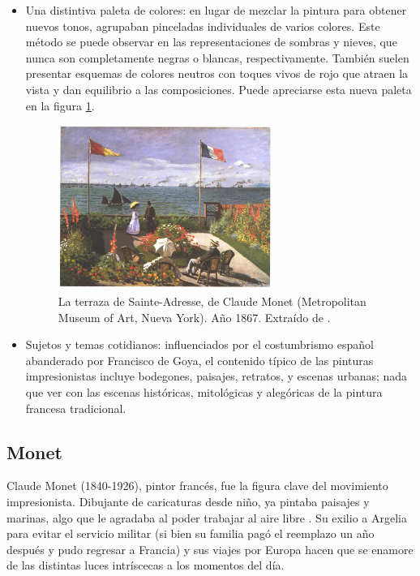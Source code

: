 \documentclass[../main.tex]{subfiles}
\begin{document}
\begin{itemize}
    \item Una distintiva paleta de colores: en lugar de mezclar la pintura para obtener nuevos tonos, agrupaban pinceladas individuales de varios colores. Este método se puede observar en las representaciones de sombras y nieves, que nunca son completamente negras o blancas, respectivamente. También suelen presentar esquemas de colores neutros con toques vivos de rojo que atraen la vista y dan equilibrio a las composiciones. Puede apreciarse esta nueva paleta en la figura \ref{fig:monet_terraza}.
    \begin{figure}[h]
        \centering
        \includegraphics[width=0.66\textwidth]{imagenes/La terraza de Sainte-Adresse.jpg}
        \caption[La terraza de Sainte-Adresse, de Claude Monet]{La terraza de Sainte-Adresse, de Claude Monet (Metropolitan Museum of Art, Nueva York). Año 1867. Extraído de \cite{Monet1867}.}
        \label{fig:monet_terraza}
    \end{figure}
    
    \item Sujetos y temas cotidianos: influenciados por el costumbrismo español abanderado por Francisco de Goya, el contenido típico de las pinturas impresionistas incluye bodegones, paisajes, retratos, y escenas urbanas; nada que ver con las escenas históricas, mitológicas y alegóricas de la pintura francesa tradicional.

\end{itemize}

\subsection{Monet}

Claude Monet (1840-1926), pintor francés, fue la figura clave del movimiento impresionista. Dibujante de caricaturas desde niño, ya pintaba paisajes y marinas, algo que le agradaba al poder trabajar al aire libre \cite{CalvoSantos2016}. Su exilio a Argelia para evitar el servicio militar (si bien su familia pagó el reemplazo un año después y pudo regresar a Francia) y sus viajes por Europa hacen que se enamore de las distintas luces intríscecas a los momentos del día. 
\end{document}
